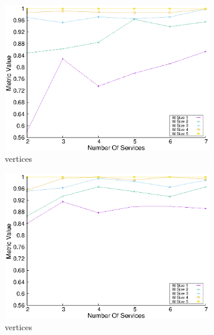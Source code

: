 \begin{figure}[H]
\begin{subfigure}{0.45\textwidth}
    \includegraphics[width=\textwidth]{Images/graphs/window_quality_performance_diff_perce_n7_s7_20_100_n5}
    \caption{ vertices}
    \label{fig:quality_window_perce_wide_5n}
  \end{subfigure}
  \hfill
  \begin{subfigure}{0.45\textwidth}
    \includegraphics[width=\textwidth]{Images/graphs/window_quality_performance_diff_perce_n7_s7_50_89_n5}
    \caption{ vertices}
    \label{fig:quality_window_average_perce_5n}
  \end{subfigure}
  \hfill
  \begin{subfigure}{0.45\textwidth}

\end{subfigure}
\end{figure}
